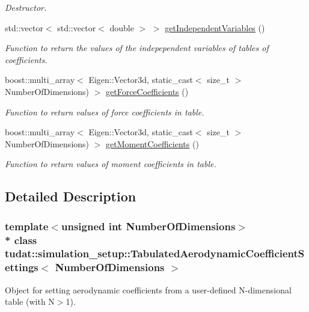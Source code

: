 \begin{DoxyCompactItemize}
\begin{DoxyCompactList}\small\item\em Destructor. \end{DoxyCompactList}\item 
std\+::vector$<$ std\+::vector$<$ double $>$ $>$ \hyperlink{classtudat_1_1simulation__setup_1_1TabulatedAerodynamicCoefficientSettings_a43c7fa0b4995bc36d22237c3af169829}{get\+Independent\+Variables} ()
\begin{DoxyCompactList}\small\item\em Function to return the values of the indepependent variables of tables of coefficients. \end{DoxyCompactList}\item 
boost\+::multi\+\_\+array$<$ Eigen\+::\+Vector3d, static\+\_\+cast$<$ size\+\_\+t $>$ Number\+Of\+Dimensions) $>$ \hyperlink{classtudat_1_1simulation__setup_1_1TabulatedAerodynamicCoefficientSettings_acbd63625faa8e31148d5e482afea7531}{get\+Force\+Coefficients} ()
\begin{DoxyCompactList}\small\item\em Function to return values of force coefficients in table. \end{DoxyCompactList}\item 
boost\+::multi\+\_\+array$<$ Eigen\+::\+Vector3d, static\+\_\+cast$<$ size\+\_\+t $>$ Number\+Of\+Dimensions) $>$ \hyperlink{classtudat_1_1simulation__setup_1_1TabulatedAerodynamicCoefficientSettings_a778a096424786b4749cc50df68340f4a}{get\+Moment\+Coefficients} ()
\begin{DoxyCompactList}\small\item\em Function to return values of moment coefficients in table. \end{DoxyCompactList}\end{DoxyCompactItemize}


\subsection{Detailed Description}
\subsubsection*{template$<$unsigned int Number\+Of\+Dimensions$>$\\*
class tudat\+::simulation\+\_\+setup\+::\+Tabulated\+Aerodynamic\+Coefficient\+Settings$<$ Number\+Of\+Dimensions $>$}

Object for setting aerodynamic coefficients from a user-\/defined N-\/dimensional table (with N$>$1). 

